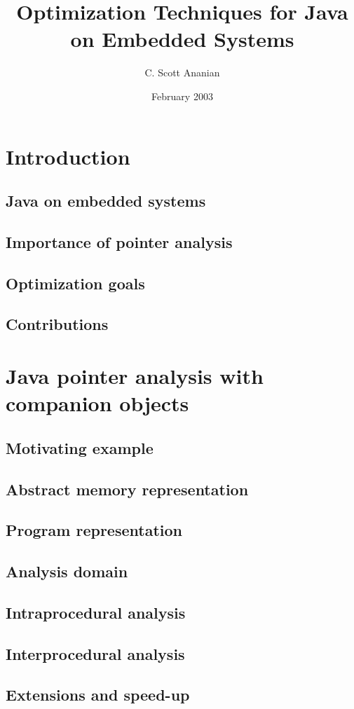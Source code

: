 \documentclass[twoside]{article}
\title{Optimization Techniques for Java on Embedded Systems}
\author{C. Scott Ananian}
\date{February 2003\\\vspace{5pt}}
\begin{document}
%
\tableofcontents\cleardoublepage

\section{Introduction}
\subsection{Java on embedded systems}
\subsection{Importance of pointer analysis}
\subsection{Optimization goals}
\subsection{Contributions}
\section{Java pointer analysis with companion objects}
\subsection{Motivating example}
\subsection{Abstract memory representation}
\subsection{Program representation}
\subsection{Analysis domain}
\subsection{Intraprocedural analysis}
\subsection{Interprocedural analysis}
\subsection{Extensions and speed-up}
\end{document}
